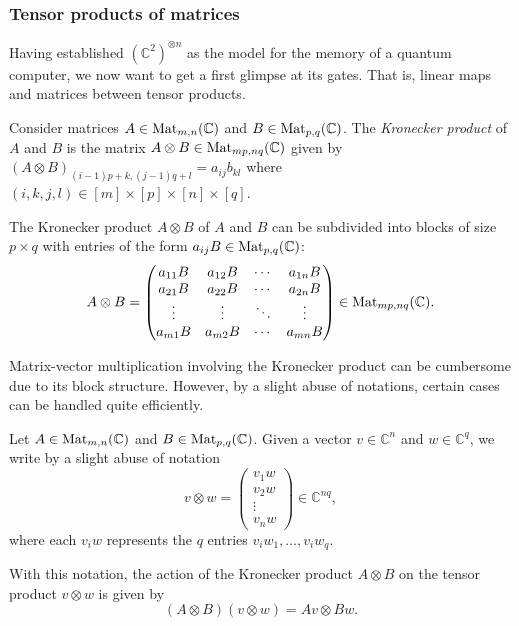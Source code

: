 \documentclass[a4paper, oneside, 12pt]{amsart}
\begin{document}
\subsubsection{Tensor products of matrices}\label{sec:tensor-products-of-matrices}
Having established \( (\mathbb{C}^{2})^{\otimes n}\) as the model for the memory of a quantum computer, we now want to get a first glimpse at its gates.
That is, linear maps and matrices between tensor products.

\begin{definition}\label{def:kronecker-product}
  Consider matrices \(A \in \operatorname{Mat}_{m,n}( \mathbb{C})\) and \(B \in \operatorname{Mat}_{p,q}( \mathbb{C})\).
  The \emph{Kronecker product} of \(A\) and \(B\)
  is the matrix \(A\otimes B \in \operatorname{Mat}_{mp,nq} ( \mathbb{C})\) given by
  \((A\otimes B)_{(i-1)p+k,(j-1)q+l}= a_{ij}b_{kl}\) where \((i,k,j,l)\in[m]\times[p]\times[n]\times[q]\).
\end{definition}
The Kronecker product \(A\otimes B\) of \(A\) and \(B\)  can be subdivided into blocks of size \(p\times q\) with entries of the  form \(a_{ij}B \in \operatorname{Mat}_{p,q}( \mathbb{C})\):
\begin{equation}
  A \otimes B = \begin{pmatrix}
    a_{11}B & a_{12}B & \cdots & a_{1n}B \\
    a_{21}B & a_{22}B & \cdots & a_{2n}B \\
    \vdots  & \vdots  & \ddots & \vdots  \\
    a_{m1}B & a_{m2}B & \cdots & a_{mn}B
  \end{pmatrix} \in \operatorname{Mat}_{mp,nq}(\mathbb{C}).
\end{equation}

Matrix-vector multiplication involving the Kronecker product can be cumbersome due to its block structure.
However, by a slight abuse of notations, certain cases can be handled quite efficiently.
\begin{remark}\label{rmk:matrix-vector-multiplication-Kronecker-product}
  Let \(A\in \operatorname{Mat}_{m,n}( \mathbb{C})\) and \(B \in \operatorname{Mat}_{p,q}( \mathbb{C})\).
  Given a vector \(v\in \mathbb{C}^{n}\) and \(w \in \mathbb{C}^{q}\), we write by a slight abuse of notation
  \begin{equation}
    v\otimes w =
    \begin{pmatrix}
      v_{1} w\\
      v_{2} w\\
      \vdots \\
      v_{n} w
    \end{pmatrix} \in \mathbb{C}^{nq},
  \end{equation}
  where each \( v_i w \) represents the \(q\) entries \(v_{i}w_{1}, \dots , v_{i}w_{q}\).

  With this notation, the action of the Kronecker product \(A\otimes B\) on the tensor product \(v\otimes w\) is given by
  \begin{equation*}
    (A\otimes B) (v\otimes w) = Av \otimes Bw.
  \end{equation*}
\end{remark}
\end{document}
